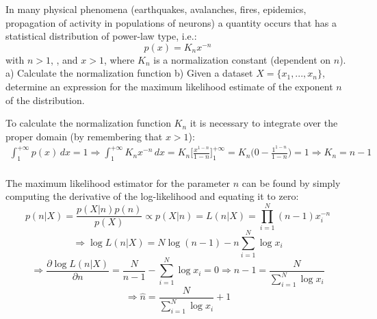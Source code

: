 \Exercise[number={3}]
In many physical phenomena (earthquakes, avalanches, fires, epidemics,
propagation of activity in populations of neurons) a quantity occurs that
has a statistical distribution of power-law type, i.e.:
\[
    p(x)=K_nx^{-n}
\]
with \(n>1\), , and \(x>1\), where \(K_n\) is a normalization constant
(dependent on \(n\)). 
a) Calculate the normalization function 
b) Given a dataset \(X=\{x_1,...,x_n\}\), determine an expression for the
maximum likelihood estimate of the exponent \(n\) of the distribution.

\Answer[number={3}]
To calculate the normalization function \(K_n\) it is necessary to
integrate over the proper domain (by remembering that \(x>1\)):
\begin{align*}
    \int_{1}^{+\infty}p(x)\,dx = 1 \Rightarrow
    \int_{1}^{+\infty}K_nx^{-n}\,dx
    =
    K_n\biggl[\frac{x^{1-n}}{1-n}\biggr]_{1}^{+\infty}
    =
    K_n\biggl(0-\frac{1^{1-n}}{1-n}\biggr)
    =
    1 \Rightarrow
    K_n=n-1
\end{align*}
\\
The maximum likelihood estimator for the parameter \(n\) can be found by
simply computing the derivative of the log-likelihood and equating it to
zero:
\[
    p(n|X)=\frac{p(X|n)p(n)}{p(X)} \propto p(X|n)=L(n|X)
    =
    \prod_{i=1}^{N}(n-1)x_i^{-n}
\]
\[
    \Rightarrow
    \log{L(n|X)}=N\log{(n-1)}-n\sum_{i=1}^{N}\log{x_i}
\]
\[
    \Rightarrow
    \frac{\partial{\log{L(n|X)}}}{\partial{n}}
    =
    \frac{N}{n-1}-\sum_{i=1}^{N}\log{x_i}
    =
    0
    \Rightarrow
    n-1=\frac{N}{\sum_{i=1}^{N}\log{x_i}}
\]
\[
    \Rightarrow \hat{n} = \frac{N}{\sum_{i=1}^{N}\log{x_i}} + 1
\]
